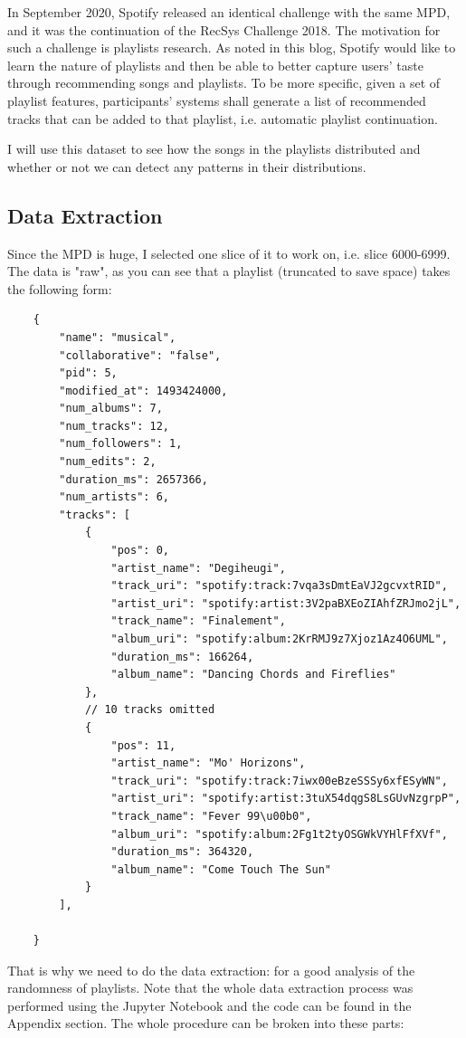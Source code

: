 \documentclass[12pt]{article}
\theoremstyle{plain}
\theoremstyle{definition}
\theoremstyle{remark}
\begin{document}
In September 2020, Spotify released an identical challenge with the same MPD, and it was the continuation of the RecSys Challenge 2018. The motivation for such a challenge is playlists research. As noted in this blog\cite{2.1}, Spotify would like to learn the nature of playlists and then be able to better capture users' taste through recommending songs and playlists. To be more specific, given a set of playlist features, participants' systems shall generate a list of recommended tracks that can be added to that playlist, i.e. automatic playlist continuation.

I will use this dataset to see how the songs in the playlists distributed and whether or not we can detect any patterns in their distributions.

\subsection{Data Extraction}
Since the MPD is huge, I selected one slice of it to work on, i.e. slice 6000-6999. The data is "raw", as you can see that a playlist (truncated to save space) takes the following form\cite{2.1}: 
\begin{verbatim}
    {
        "name": "musical",
        "collaborative": "false",
        "pid": 5,
        "modified_at": 1493424000,
        "num_albums": 7,
        "num_tracks": 12,
        "num_followers": 1,
        "num_edits": 2,
        "duration_ms": 2657366,
        "num_artists": 6,
        "tracks": [
            {
                "pos": 0,
                "artist_name": "Degiheugi",
                "track_uri": "spotify:track:7vqa3sDmtEaVJ2gcvxtRID",
                "artist_uri": "spotify:artist:3V2paBXEoZIAhfZRJmo2jL",
                "track_name": "Finalement",
                "album_uri": "spotify:album:2KrRMJ9z7Xjoz1Az4O6UML",
                "duration_ms": 166264,
                "album_name": "Dancing Chords and Fireflies"
            },
            // 10 tracks omitted
            {
                "pos": 11,
                "artist_name": "Mo' Horizons",
                "track_uri": "spotify:track:7iwx00eBzeSSSy6xfESyWN",
                "artist_uri": "spotify:artist:3tuX54dqgS8LsGUvNzgrpP",
                "track_name": "Fever 99\u00b0",
                "album_uri": "spotify:album:2Fg1t2tyOSGWkVYHlFfXVf",
                "duration_ms": 364320,
                "album_name": "Come Touch The Sun"
            }
        ],

    }
\end{verbatim}
That is why we need to do the data extraction: for a good analysis of the randomness of playlists. Note that the whole data extraction process was performed using the Jupyter Notebook and the code can be found in the Appendix section. The whole procedure can be broken into these parts: 
\end{document}
